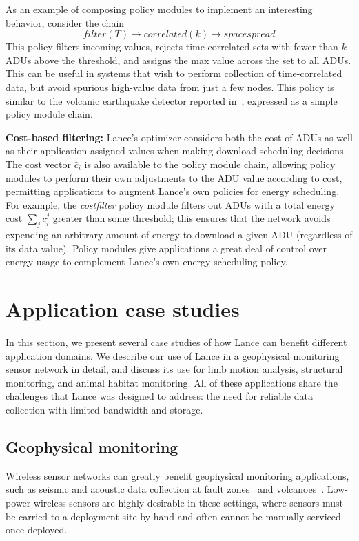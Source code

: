 \documentclass[lettersize]{sig-alternate-konrad}
\begin{document}
As an example of composing policy modules to implement an interesting
behavior, consider the chain
\[
\mathit{filter}(T)\rightarrow\mathit{correlated}(k)\rightarrow\mathit{spacespread}
\]
This policy filters incoming values, rejects time-correlated sets 
with fewer than $k$ ADUs above the threshold, and assigns the max
value across the set to all ADUs. This can be useful in 
systems that wish to perform collection of time-correlated data, but
avoid spurious high-value data from just a few nodes. 
This policy is similar to the volcanic earthquake detector reported 
in~\cite{volcano-osdi06}, expressed as a simple policy module chain.

{\bf Cost-based filtering:}
Lance's optimizer considers both the cost of ADUs as well as their
application-assigned values when making download scheduling decisions.
The cost vector $\bar{c}_i$ is also available to the policy module
chain, allowing policy modules to perform their own adjustments to
the ADU value according to cost, permitting applications to augment 
Lance's own policies for energy scheduling. 
For example, the {\em costfilter} policy module filters out ADUs with
a total energy cost $\sum_j c_i^j$ greater than some threshold; this
ensures that the network avoids expending an arbitrary amount of
energy to download a given ADU (regardless of its data value). 
Policy modules give applications a great deal of control over energy 
usage to complement Lance's own energy scheduling policy.

\section{Application case studies}
\label{sec-applications}
\label{sec-casestudy}

In this section, we present several case studies of how Lance can
benefit different application domains. We describe our use of Lance in
a geophysical monitoring sensor network in detail, and discuss its use for
limb motion analysis, structural monitoring, and animal habitat
monitoring. All of these applications share the challenges that Lance was 
designed to address: the need for reliable data collection with 
limited bandwidth and storage. 

\subsection{Geophysical monitoring}

Wireless sensor networks can greatly benefit geophysical monitoring
applications, such as seismic and acoustic data collection at fault
zones~\cite{ucla-seismic} and volcanoes~\cite{volcano-osdi06}. Low-power
wireless sensors are highly desirable in these settings, where sensors must
be carried to a deployment site by hand and often cannot be manually serviced
once deployed. 
\end{document}
